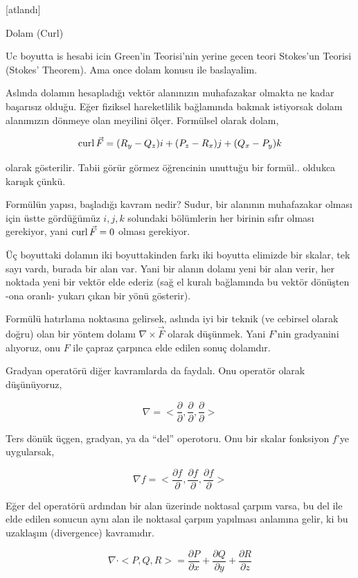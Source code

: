 \documentclass[12pt,fleqn]{article}\usepackage{../../common}
\begin{document}
[atlandı]

Dolam (Curl)

Uc boyutta is hesabi icin Green'in Teorisi'nin yerine gecen teori Stokes'un
Teorisi (Stokes' Theorem). Ama once dolam konusu ile baslayalim.

Aslında dolamın hesapladığı vektör alanınızın muhafazakar olmakta ne kadar
başarısız olduğu. Eğer fiziksel hareketlilik bağlamında bakmak istiyorsak
dolam alanımızın dönmeye olan meyilini ölçer. Formülsel olarak dolam,

$$
\operatorname{curl} \vec{F} = (R_y - Q_z) i + (P_z - R_x) j + (Q_x - P_y) k
$$

olarak gösterilir. Tabii görür görmez öğrencinin unuttuğu bir formül..
oldukca karışık çünkü.

Formülün yapısı, başladığı kavram nedir? Sudur, bir alanının muhafazakar olması
için üstte gördüğümüz $i,j,k$ solundaki bölümlerin her birinin sıfır olması
gerekiyor, yani $\operatorname{curl} \vec{F} = 0$ olması gerekiyor.

Üç boyuttaki dolamın iki boyuttakinden farkı iki boyutta elimizde bir skalar,
tek sayı vardı, burada bir alan var. Yani bir alanın dolamı yeni bir alan verir,
her noktada yeni bir vektör elde ederiz (sağ el kuralı bağlamında bu vektör
dönüşten -ona oranlı- yukarı çıkan bir yönü gösterir). 

Formülü hatırlama noktasına gelirsek, aslında iyi bir teknik (ve cebirsel olarak
doğru) olan bir yöntem dolamı $\nabla \times \vec{F}$ olarak düşünmek. Yani
$F$'nin gradyanini alıyoruz, onu $F$ ile çapraz çarpınca elde edilen sonuç
dolamdır. 

Gradyan operatörü diğer kavramlarda da faydalı. Onu operatör olarak düşünüyoruz,

$$
\nabla = < \frac{\partial }{\partial },
           \frac{\partial }{\partial },
           \frac{\partial }{\partial } >
$$

Ters dönük üçgen, gradyan, ya da ``del'' operotoru. Onu bir skalar fonksiyon
$f$'ye uygularsak,

$$
\nabla f = < \frac{\partial f}{\partial },
             \frac{\partial f}{\partial },
             \frac{\partial f}{\partial } >
$$

Eğer del operatörü ardından bir alan üzerinde noktasal çarpım varsa, bu del
ile elde edilen sonucun aynı alan ile noktasal çarpım yapılması anlamına
gelir, ki bu uzaklaşım (divergence) kavramıdır.

$$
\nabla \cdot < P,Q,R > =
\frac{\partial P}{\partial x} +
\frac{\partial Q}{\partial y} +
\frac{\partial R}{\partial z}
$$
\end{document}
